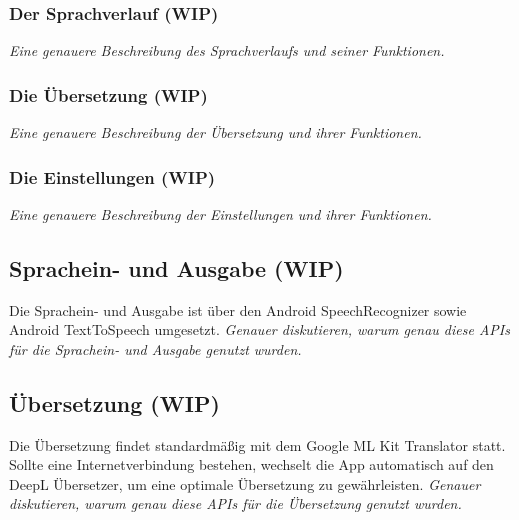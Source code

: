 \subsubsection{Der Sprachverlauf (WIP)}
\textit{Eine genauere Beschreibung des Sprachverlaufs und seiner Funktionen.}

\subsubsection{Die Übersetzung (WIP)}
\textit{Eine genauere Beschreibung der Übersetzung und ihrer Funktionen.}

\subsubsection{Die Einstellungen (WIP)}
\textit{Eine genauere Beschreibung der Einstellungen und ihrer Funktionen.}

\subsection{Sprachein- und Ausgabe (WIP)}
Die Sprachein- und Ausgabe ist über den Android SpeechRecognizer sowie Android TextToSpeech umgesetzt. 
\newline
\newline
\textit{Genauer diskutieren, warum genau diese APIs für die Sprachein- und Ausgabe genutzt wurden.}

\subsection{Übersetzung (WIP)}
Die Übersetzung findet standardmäßig mit dem Google ML Kit Translator statt. Sollte eine Internetverbindung bestehen, wechselt die App automatisch auf den DeepL Übersetzer, um eine optimale Übersetzung zu gewährleisten.
\newline
\newline
\textit{Genauer diskutieren, warum genau diese APIs für die Übersetzung genutzt wurden.}